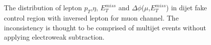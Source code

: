 \begin{figure}[ht]
       \centering
        \\
       \\
       \caption{The distribution of lepton $p_{T}$,$\eta$, $E_{T}^{miss}$ and $\Delta\phi$($\mu$,$E_{T}^{miss}$) in dijet fake control region with inversed lepton for muon channel. The inconsistency is thought to be comprised of multijet events without applying electroweak subtraction.}
       \label{fig:dijetFakeCR_mu}
\end{figure}

